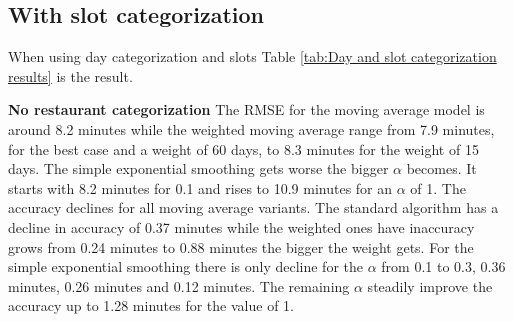 \subsection{With slot categorization}
When using day categorization and slots Table \ref{tab:Day and slot categorization results} is the result.
\begin{table}[h]
\centering
\caption{Day categorization with slots}
\label{tab:Day and slot categorization results}
\end{table}
\newline\newline\textbf{No restaurant categorization}\newline
The RMSE for the moving average model is around 8.2 minutes while the weighted moving average range from 7.9 minutes, for the best case and a weight of 60 days, to 8.3 minutes for the weight of 15 days. The simple exponential smoothing gets worse the bigger $\alpha$ becomes. It starts with 8.2 minutes for 0.1 and rises to 10.9 minutes for an $\alpha$ of 1. The accuracy declines for all moving average variants. The standard algorithm has a decline in accuracy of 0.37 minutes while the weighted ones have inaccuracy grows from 0.24 minutes to 0.88 minutes the bigger the weight gets. For the simple exponential smoothing there is only decline for the $\alpha$ from 0.1 to 0.3, 0.36 minutes, 0.26 minutes and 0.12 minutes. The remaining $\alpha$ steadily improve the accuracy up to 1.28 minutes for the value of 1.\newline

